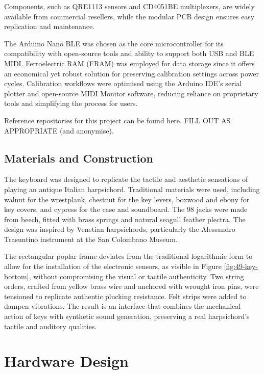 Components, such as QRE1113 sensors and CD4051BE multiplexers, are widely available from commercial resellers, while the modular PCB design ensures easy replication and maintenance.

The Arduino Nano BLE was chosen as the core microcontroller for its compatibility with open-source tools and ability to support both USB and BLE MIDI. Ferroelectric RAM (FRAM) was employed for data storage since it offers an economical yet robust solution for preserving calibration settings across power cycles. Calibration workflows were optimised using the Arduino IDE’s serial plotter and open-source MIDI Monitor software, reducing reliance on proprietary tools and simplifying the process for users. 

Reference repositories for this project can be found here. FILL OUT AS APPROPRIATE (and anonymise).

\subsection{Materials and Construction}

The keyboard was designed to replicate the tactile and aesthetic sensations of playing an antique Italian harpsichord. Traditional materials were used, including walnut for the wrestplank, chestnut for the key levers, boxwood and ebony for key covers, and cypress for the case and soundboard. The 98 jacks were made from beech, fitted with brass springs and natural seagull feather plectra. The design was inspired by Venetian harpsichords, particularly the Alessandro Trasuntino instrument at the San Colombano Museum. 

The rectangular poplar frame deviates from the traditional logarithmic form to allow for the installation of the electronic sensors, as visible in Figure \ref{fig:49-key-bottom}, without compromising the visual or tactile authenticity. Two string orders, crafted from yellow brass wire and anchored with wrought iron pins, were tensioned to replicate authentic plucking resistance. Felt strips were added to dampen vibrations. The result is an interface that combines the mechanical action of keys with synthetic sound generation, preserving a real harpsichord's tactile and auditory qualities.


\section{Hardware Design}\label{hardware-design}

